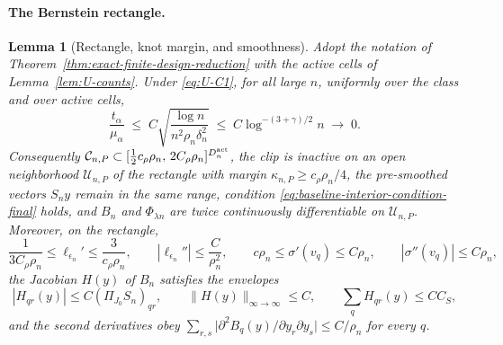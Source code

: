 \documentclass[11pt]{article}
\newtheorem{lemma}[theorem]{Lemma}
\theoremstyle{definition}
\newcommand{\1}{\mathbf 1}\newcommand{\op}{\operatorname}
\begin{document}
\paragraph{The Bernstein rectangle.}

\begin{lemma}[Rectangle, knot margin, and smoothness]\label{lem:U-rect}
Adopt the notation of Theorem~\ref{thm:exact-finite-design-reduction} with the
active cells of Lemma~\ref{lem:U-counts}.  Under \eqref{eq:U-C1}, for all large
$n$, uniformly over the class and over active cells,
\[
\frac{t_\alpha}{\mu_\alpha}
\;\le\;
C\sqrt{\frac{\log n}{n^2\rho_n\delta_n^2}}
\;\le\;C\log^{-(3+\gamma)/2}n\;\longrightarrow\;0 .
\]
Consequently $\mathcal C_{n,P}\subset[\tfrac12c_\rho\rho_n,\,2C_\rho\rho_n]^{
D_n^{\rm act}}$, the clip is inactive on an open neighborhood
$\mathcal U_{n,P}$ of the rectangle with margin
$\kappa_{n,P}\ge c_\rho\rho_n/4$, the pre-smoothed vectors $S_ny$ remain in the
same range, condition \eqref{eq:baseline-interior-condition-final} holds, and
$B_n$ and $\Phi_{\lambda n}$ are twice continuously differentiable on
$\mathcal U_{n,P}$.  Moreover, on the rectangle,
\[
\frac{1}{3C_\rho\rho_n}\le\ell_{\epsilon_n}'\le\frac{3}{c_\rho\rho_n},
\qquad
|\ell_{\epsilon_n}''|\le\frac{C}{\rho_n^2},
\qquad
c\rho_n\le\sigma'(v_q)\le C\rho_n,
\qquad
|\sigma''(v_q)|\le C\rho_n,
\]
the Jacobian $H(y)$ of $B_n$ satisfies the envelopes
\[
|H_{qr}(y)|\le C(\Pi_{J_0}S_n)_{qr},
\qquad
\|H(y)\|_{\infty\to\infty}\le C,
\qquad
\textstyle\sum_qH_{qr}(y)\le CC_S,
\]
and the second derivatives obey
$\sum_{r,s}\bigl|\partial^2B_q(y)/\partial y_r\partial y_s\bigr|\le C/\rho_n$
for every $q$.
\end{lemma}
\end{document}
